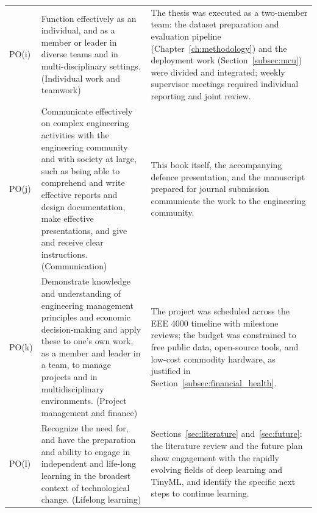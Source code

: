 \begin{longtable}{@{}>{\raggedright\arraybackslash}p{0.55in}>{\raggedright\arraybackslash}p{3.1in}>{\raggedright\arraybackslash}p{1.5in}@{}}
PO(i) & Function effectively as an individual, and as a member or leader in
diverse teams and in multi-disciplinary settings.
(Individual work and teamwork) & The thesis was executed as a two-member
team: the dataset preparation and evaluation pipeline (Chapter~\ref{ch:methodology}) and the
deployment work (Section~\ref{subsec:mcu}) were divided and integrated; weekly
supervisor meetings required individual reporting and joint review. \\
\addlinespace

PO(j) & Communicate effectively on complex engineering activities with the
engineering community and with society at large, such as being able to
comprehend and write effective reports and design documentation, make
effective presentations, and give and receive clear instructions.
(Communication) & This book itself, the accompanying defence presentation,
and the manuscript prepared for journal submission communicate the work to
the engineering community. \\
\addlinespace

PO(k) & Demonstrate knowledge and understanding of engineering management
principles and economic decision-making and apply these to one's own work,
as a member and leader in a team, to manage projects and in
multidisciplinary environments. (Project management and finance)
& The project was scheduled across the EEE 4000 timeline with milestone
reviews; the budget was constrained to free public data, open-source tools,
and low-cost commodity hardware, as justified in
Section~\ref{subsec:financial_health}. \\
\addlinespace

PO(l) & Recognize the need for, and have the preparation and ability to
engage in independent and life-long learning in the broadest context of
technological change. (Lifelong learning)
& Sections~\ref{sec:literature} and~\ref{sec:future}: the literature review
and the future plan show
engagement with the rapidly evolving fields of deep learning and TinyML,
and identify the specific next steps to continue learning. \\

\end{longtable}

